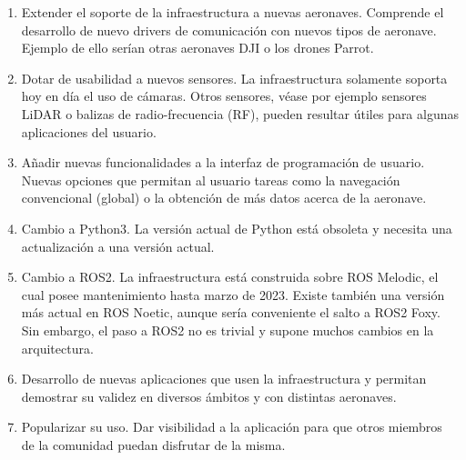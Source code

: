 \documentclass[../main.tex]{subfiles}
\begin{document}
\begin{enumerate}
    \item Extender el soporte de la infraestructura a nuevas aeronaves. Comprende el desarrollo de nuevo drivers de comunicación con nuevos tipos de aeronave. Ejemplo de ello serían otras aeronaves DJI o los drones Parrot.
    \item Dotar de usabilidad a nuevos sensores. La infraestructura solamente soporta hoy en día el uso de cámaras. Otros sensores, véase por ejemplo sensores LiDAR o balizas de radio-frecuencia (RF), pueden resultar útiles para algunas aplicaciones del usuario.
    \item Añadir nuevas funcionalidades a la interfaz de programación de usuario. Nuevas opciones que permitan al usuario tareas como la navegación convencional (global) o la obtención de más datos acerca de la aeronave.
    \item Cambio a Python3. La versión actual de Python está obsoleta y necesita una actualización a una versión actual.
    \item Cambio a ROS2. La infraestructura está construida sobre ROS Melodic, el cual posee mantenimiento hasta marzo de 2023. Existe también una versión más actual en ROS Noetic, aunque sería conveniente el salto a ROS2 Foxy. Sin embargo, el paso a ROS2 no es trivial y supone muchos cambios en la arquitectura.
    \item Desarrollo de nuevas aplicaciones que usen la infraestructura y permitan demostrar su validez en diversos ámbitos y con distintas aeronaves.
    \item Popularizar su uso. Dar visibilidad a la aplicación para que otros miembros de la comunidad puedan disfrutar de la misma.
\end{enumerate}
\end{document}
